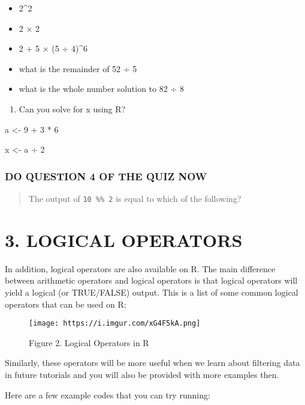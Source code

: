\documentclass[
]{book}
\providecommand{\tightlist}{%
  \setlength{\itemsep}{0pt}\setlength{\parskip}{0pt}}
\begin{document}
\begin{itemize}
\tightlist
\item
  2\^{}2
\item
  2 × 2
\item
  2 + 5 × (5 ÷ 4)\^{}6
\item
  what is the remainder of 52 ÷ 5
\item
  what is the whole number solution to 82 ÷ 8
\end{itemize}

\begin{enumerate}
\def\labelenumi{\alph{enumi}.}
\setcounter{enumi}{1}
\tightlist
\item
  Can you solve for x using R?
\end{enumerate}

a \textless- 9 + 3 * 6

x \textless- a ÷ 2

\hypertarget{do-question-4-of-the-quiz-now}{%
\subsubsection{DO QUESTION 4 OF THE QUIZ NOW}\label{do-question-4-of-the-quiz-now}}

\begin{quote}
The output of \texttt{10\ \%\%\ 2} is equal to which of the following?
\end{quote}

\hypertarget{logical-operators}{%
\section{3. LOGICAL OPERATORS}\label{logical-operators}}

In addition, logical operators are also available on R. The main difference between arithmetic operators and logical operators is that logical operators will yield a logical (or TRUE/FALSE) output. This is a list of some common logical operators that can be used on R:

\begin{figure}
\centering
\texttt{[image: https://i.imgur.com/xG4F5kA.png]}
\caption{Figure 2. Logical Operators in R}
\end{figure}

Similarly, these operators will be more useful when we learn about filtering data in future tutorials and you will also be provided with more examples then.

Here are a few example codes that you can try running:
\end{document}
